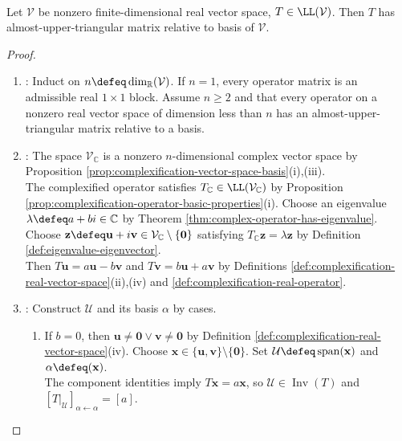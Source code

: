 \begin{theorem} \label{thm:real-almost-upper-triangularization} \\
Let $\mathcal{V}$ be nonzero finite-dimensional real vector space, $T\in\LL(\mathcal{V})$. Then $T$ has almost-upper-triangular matrix relative to basis of $\mathcal{V}$.
\begin{proof}
\begin{enumerate}[label=(\roman*)]
\setlength{\itemsep}{0pt}
\item {}: Induct on $n\defeq\dim_{\mathbb{R}}(\mathcal{V})$. If $n=1$, every operator matrix is an admissible real $1\times1$ block. Assume $n\geq2$ and that every operator on a nonzero real vector space of dimension less than $n$ has an almost-upper-triangular matrix relative to a basis.
\item {}: The space $\mathcal{V}_{\mathbb{C}}$ is a nonzero $n$-dimensional complex vector space by Proposition \ref{prop:complexification-vector-space-basis}(i),(iii).\\
The complexified operator satisfies $T_{\mathbb{C}}\in\LL(\mathcal{V}_{\mathbb{C}})$ by Proposition \ref{prop:complexification-operator-basic-properties}(i). Choose an eigenvalue $\lambda\defeq a+bi\in\mathbb{C}$ by Theorem \ref{thm:complex-operator-has-eigenvalue}.\\
Choose $\mathbf{z}\defeq\mathbf{u}+i\mathbf{v}\in\mathcal{V}_{\mathbb{C}}\setminus\{\mathbf{0}\}$ satisfying $T_{\mathbb{C}}\mathbf{z}=\lambda\mathbf{z}$ by Definition \ref{def:eigenvalue-eigenvector}.\\
Then $T\mathbf{u}=a\mathbf{u}-b\mathbf{v}$ and $T\mathbf{v}=b\mathbf{u}+a\mathbf{v}$ by Definitions \ref{def:complexification-real-vector-space}(ii),(iv) and \ref{def:complexification-real-operator}.
\item {}: Construct $\mathcal{U}$ and its basis $\alpha$ by cases.
\begin{enumerate}[label=(\alph*)]
\setlength{\itemsep}{0pt}
\item If $b=0$, then $\mathbf{u}\neq\mathbf{0}\lor\mathbf{v}\neq\mathbf{0}$ by Definition \ref{def:complexification-real-vector-space}(iv). Choose $\mathbf{x}\in\{\mathbf{u},\mathbf{v}\}\setminus\{\mathbf{0}\}$. Set $\mathcal{U}\defeq\operatorname{span}(\mathbf{x})$ and $\alpha\defeq(\mathbf{x})$.\\
The component identities imply $T\mathbf{x}=a\mathbf{x}$, so $\mathcal{U}\in\operatorname{Inv}(T)$ and $[T|_{\mathcal{U}}]_{\alpha\leftarrow\alpha}=[a]$.

\end{enumerate}
\end{enumerate}
\end{proof}
\end{theorem}
